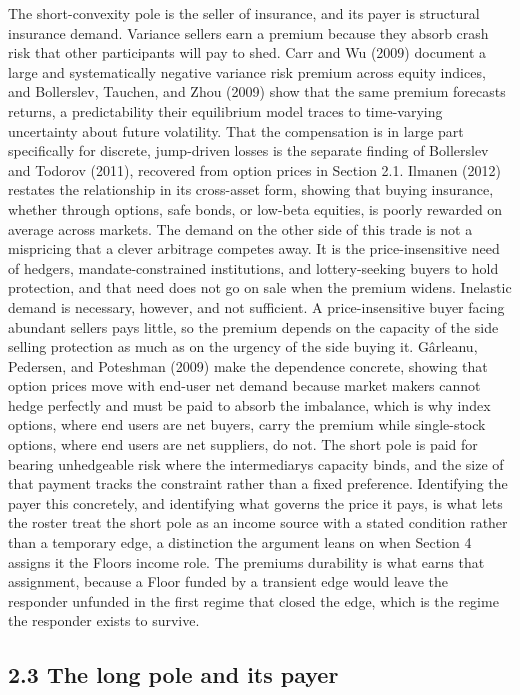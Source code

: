 \documentclass[12pt, a4paper]{article}
\begin{document}
The short-convexity pole is the seller of insurance, and its payer is
structural insurance demand. Variance sellers earn a premium because
they absorb crash risk that other participants will pay to shed. Carr
and Wu (2009) document a large and systematically negative variance risk
premium across equity indices, and Bollerslev, Tauchen, and Zhou (2009)
show that the same premium forecasts returns, a predictability their
equilibrium model traces to time-varying uncertainty about future
volatility. That the compensation is in large part specifically for
discrete, jump-driven losses is the separate finding of Bollerslev and
Todorov (2011), recovered from option prices in Section 2.1. Ilmanen
(2012) restates the relationship in its cross-asset form, showing that
buying insurance, whether through options, safe bonds, or low-beta
equities, is poorly rewarded on average across markets. The demand on
the other side of this trade is not a mispricing that a clever arbitrage
competes away. It is the price-insensitive need of hedgers,
mandate-constrained institutions, and lottery-seeking buyers to hold
protection, and that need does not go on sale when the premium widens.
Inelastic demand is necessary, however, and not sufficient. A
price-insensitive buyer facing abundant sellers pays little, so the
premium depends on the capacity of the side selling protection as much
as on the urgency of the side buying it. Gârleanu, Pedersen, and
Poteshman (2009) make the dependence concrete, showing that option
prices move with end-user net demand because market makers cannot hedge
perfectly and must be paid to absorb the imbalance, which is why index
options, where end users are net buyers, carry the premium while
single-stock options, where end users are net suppliers, do not. The
short pole is paid for bearing unhedgeable risk where the
intermediary\textquotesingle s capacity binds, and the size of that
payment tracks the constraint rather than a fixed preference.
Identifying the payer this concretely, and identifying what governs the
price it pays, is what lets the roster treat the short pole as an income
source with a stated condition rather than a temporary edge, a
distinction the argument leans on when Section 4 assigns it the
Floor\textquotesingle s income role. The premium\textquotesingle s
durability is what earns that assignment, because a Floor funded by a
transient edge would leave the responder unfunded in the first regime
that closed the edge, which is the regime the responder exists to
survive.

\subsection*{2.3 The long pole and its
payer}\label{the-long-pole-and-its-payer}
\end{document}
